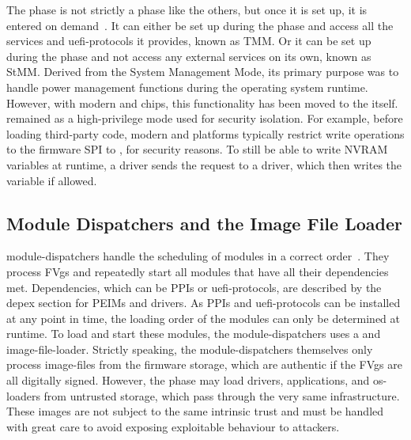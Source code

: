 The  phase is not strictly a phase like the others, but once it is set up, it is entered on demand~\cite{pi-spec}. It can either be set up during the  phase and access all the services and \glspl{uefi-protocol} it provides, known as \gls{TMM}. Or it can be set up during the  phase and not access any external services on its own, known as \gls{StMM}. Derived from the  System Management Mode, its primary purpose was to handle power management functions during the operating system runtime. However, with modern  and  chips, this functionality has been moved to the  itself.  remained as a high-privilege mode used for security isolation. For example, before loading third-party code, modern  and  platforms typically restrict write operations to the \gls{firmware} \gls{SPI} to , for security reasons. To still be able to write \gls{NVRAM} variables at runtime, a  driver sends the request to a  driver, which then writes the variable if allowed.

\subsection{Module Dispatchers and the Image File Loader}

 \glspl{module-dispatcher} handle the scheduling of modules in a correct order~\cite{pi-spec}. They process \glspl{FVg} and repeatedly start all modules that have all their dependencies met. Dependencies, which can be \glspl{PPI} or \glspl{uefi-protocol}, are described by the \gls{depex} section for  \glspl{PEIM} and  drivers. As \glspl{PPI} and \glspl{uefi-protocol} can be installed at any point in time, the loading order of the modules can only be determined at runtime. To load and start these modules, the \glspl{module-dispatcher} uses a  and  \gls{image-file-loader}. Strictly speaking, the \glspl{module-dispatcher} themselves only process \glspl{image-file} from the \gls{firmware} storage, which are authentic if the \glspl{FVg} are all digitally signed. However, the  phase may load  drivers, applications, and \glspl{os-loader} from untrusted storage, which pass through the very same infrastructure. These \glspl{image} are not subject to the same intrinsic trust and must be handled with great care to avoid exposing exploitable behaviour to attackers.


